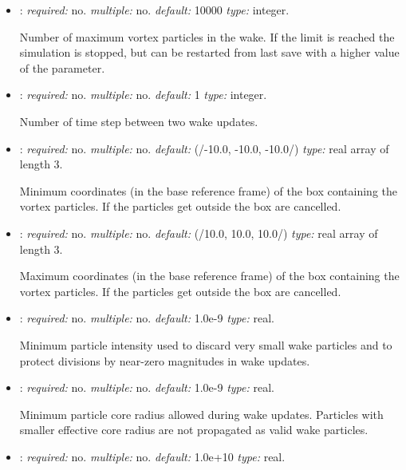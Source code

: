 \begin{itemize}
Number of panel wake rows before converting the wake to vortex particles.


\item {}: \textit{required:} no. \textit{multiple:} no. 
\textit{default:} 10000 \textit{type:} integer.

Number of maximum vortex particles in the wake. If the limit is reached the simulation is 
stopped, but can be restarted from last save with a higher value of the parameter. 

\item {}: \textit{required:} no. \textit{multiple:} no. 
\textit{default:} 1 \textit{type:} integer.

Number of time step between two wake updates. 

\item {}: \textit{required:} no. \textit{multiple:} no. 
\textit{default:} (/-10.0, -10.0, -10.0/) \textit{type:} real array of length 3.

Minimum coordinates (in the base reference frame) of the box containing the vortex 
particles. If the particles get outside the box are cancelled.

\item {}: \textit{required:} no. \textit{multiple:} no. 
\textit{default:} (/10.0, 10.0, 10.0/) \textit{type:} real array of length 3.

Maximum coordinates (in the base reference frame) of the box containing the vortex 
particles. If the particles get outside the box are cancelled.

\item {}: \textit{required:} no. \textit{multiple:} no.
\textit{default:} 1.0e-9 \textit{type:} real.

Minimum particle intensity used to discard very small wake particles and to
protect divisions by near-zero magnitudes in wake updates.

\item {}: \textit{required:} no. \textit{multiple:} no.
\textit{default:} 1.0e-9 \textit{type:} real.

Minimum particle core radius allowed during wake updates. Particles with
smaller effective core radius are not propagated as valid wake particles.

\item {}: \textit{required:} no. \textit{multiple:} no.
\textit{default:} 1.0e+10 \textit{type:} real.


\end{itemize}
